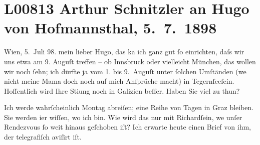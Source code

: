 

\section[Arthur Schnitzler an Hugo von Hofmannsthal, 5. 7. 1898]{L00813 Arthur Schnitzler an Hugo von Hofmannsthal, 5. 7. 1898}
\nopagebreak{}
\rehead{ }\normalsize\beginnumbering{}
\toendnotes[C]{\smallbreak\pagebreak[2]}
\toendnotes[C]{\smallbreak}
\pstart
           \raggedleft{}{\pb}Wien, 5. Juli 98.\pend
           \vspace{0.5em}
\pstart
           mein lieber Hugo, das ka{\geminationn} ich ganz gut
               ſo einrichten, daſs wir uns etwa am 9. Auguſt treffen – ob Innsbruck oder vielleicht München, das wollen wir noch ſehn; ich dürfte ja vom
                  1. bis 9. Auguſt unter ſolchen Umſtänden (we{\geminationn} nicht meine Mama doch noch auf mich Anſprüche macht) in Tegernſeeſein. Hoffentlich wird Ihre Sti{\geminationm}ung {\pb}noch in Galizien beſſer. Haben Sie viel zu thun?\pend
           
\pstart
           Ich werde wahrſcheinlich Montag abreiſen; eine Reihe von Tagen in Graz bleiben. Sie werden i{\geminationm}er wiſſen, wo ich bin. Wie wird das nur mit Richardſein, we{\geminationn} unſer
               Rendezvous ſo weit hinaus geſchoben iſt? Ich erwarte heute einen Brief von ihm, der
               telegrafiſch aviſirt iſt.\pend
           
